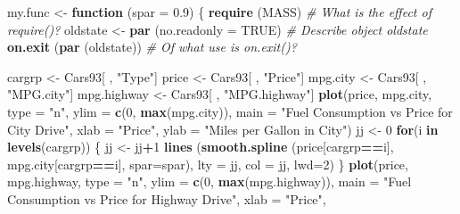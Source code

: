 \documentclass[
]{book}
\newenvironment{Shaded}{\begin{snugshade}}{\end{snugshade}}
\newcommand{\AttributeTok}[1]{\textcolor[rgb]{0.13,0.29,0.53}{#1}}
\newcommand{\CommentTok}[1]{\textcolor[rgb]{0.56,0.35,0.01}{\textit{#1}}}
\newcommand{\ConstantTok}[1]{\textcolor[rgb]{0.56,0.35,0.01}{#1}}
\newcommand{\ControlFlowTok}[1]{\textcolor[rgb]{0.13,0.29,0.53}{\textbf{#1}}}
\newcommand{\DecValTok}[1]{\textcolor[rgb]{0.00,0.00,0.81}{#1}}
\newcommand{\FloatTok}[1]{\textcolor[rgb]{0.00,0.00,0.81}{#1}}
\newcommand{\FunctionTok}[1]{\textcolor[rgb]{0.13,0.29,0.53}{\textbf{#1}}}
\newcommand{\NormalTok}[1]{#1}
\newcommand{\OtherTok}[1]{\textcolor[rgb]{0.56,0.35,0.01}{#1}}
\newcommand{\SpecialCharTok}[1]{\textcolor[rgb]{0.81,0.36,0.00}{\textbf{#1}}}
\newcommand{\StringTok}[1]{\textcolor[rgb]{0.31,0.60,0.02}{#1}}
\begin{document}
\begin{Shaded}
\begin{Highlighting}[]
\NormalTok{my.func }\OtherTok{\textless{}{-}} \ControlFlowTok{function}\NormalTok{ (}\AttributeTok{spar =} \FloatTok{0.9}\NormalTok{)}
\NormalTok{\{ }\FunctionTok{require}\NormalTok{ (MASS)                             }\CommentTok{\# What is the effect of require()?}
\NormalTok{  oldstate }\OtherTok{\textless{}{-}} \FunctionTok{par}\NormalTok{ (}\AttributeTok{no.readonly =} \ConstantTok{TRUE}\NormalTok{)       }\CommentTok{\# Describe object \textquotesingle{}oldstate\textquotesingle{}}
  \FunctionTok{on.exit}\NormalTok{ (}\FunctionTok{par}\NormalTok{ (oldstate))                   }\CommentTok{\# Of what use is on.exit()?}

\NormalTok{  cargrp }\OtherTok{\textless{}{-}}\NormalTok{ Cars93[ , }\StringTok{"Type"}\NormalTok{]}
\NormalTok{  price }\OtherTok{\textless{}{-}}\NormalTok{ Cars93[ , }\StringTok{"Price"}\NormalTok{]}
\NormalTok{  mpg.city }\OtherTok{\textless{}{-}}\NormalTok{ Cars93[ , }\StringTok{"MPG.city"}\NormalTok{]}
\NormalTok{  mpg.highway }\OtherTok{\textless{}{-}}\NormalTok{ Cars93[ , }\StringTok{"MPG.highway"}\NormalTok{]}
  \FunctionTok{plot}\NormalTok{(price, mpg.city, }\AttributeTok{type =} \StringTok{"n"}\NormalTok{, }\AttributeTok{ylim =} \FunctionTok{c}\NormalTok{(}\DecValTok{0}\NormalTok{, }\FunctionTok{max}\NormalTok{(mpg.city)), }
       \AttributeTok{main =} \StringTok{"Fuel Consumption vs Price for City Drive"}\NormalTok{, }\AttributeTok{xlab =} \StringTok{"Price"}\NormalTok{, }
       \AttributeTok{ylab =} \StringTok{"Miles per Gallon in City"}\NormalTok{)}
\NormalTok{  jj }\OtherTok{\textless{}{-}} \DecValTok{0}
  \ControlFlowTok{for}\NormalTok{(i }\ControlFlowTok{in} \FunctionTok{levels}\NormalTok{(cargrp))}
\NormalTok{    \{  jj }\OtherTok{\textless{}{-}}\NormalTok{ jj}\SpecialCharTok{+}\DecValTok{1}
       \FunctionTok{lines}\NormalTok{ (}\FunctionTok{smooth.spline}\NormalTok{ (price[cargrp}\SpecialCharTok{==}\NormalTok{i], mpg.city[cargrp}\SpecialCharTok{==}\NormalTok{i], }\AttributeTok{spar=}\NormalTok{spar),}
              \AttributeTok{lty =}\NormalTok{ jj, }\AttributeTok{col =}\NormalTok{ jj, }\AttributeTok{lwd=}\DecValTok{2}\NormalTok{)}
\NormalTok{    \}}
  \FunctionTok{plot}\NormalTok{(price, mpg.highway, }\AttributeTok{type =} \StringTok{"n"}\NormalTok{, }\AttributeTok{ylim =} \FunctionTok{c}\NormalTok{(}\DecValTok{0}\NormalTok{, }\FunctionTok{max}\NormalTok{(mpg.highway)), }
       \AttributeTok{main =} \StringTok{"Fuel Consumption vs Price for Highway Drive"}\NormalTok{, }\AttributeTok{xlab =} \StringTok{"Price"}\NormalTok{, }

\end{Highlighting}
\end{Shaded}
\end{document}
